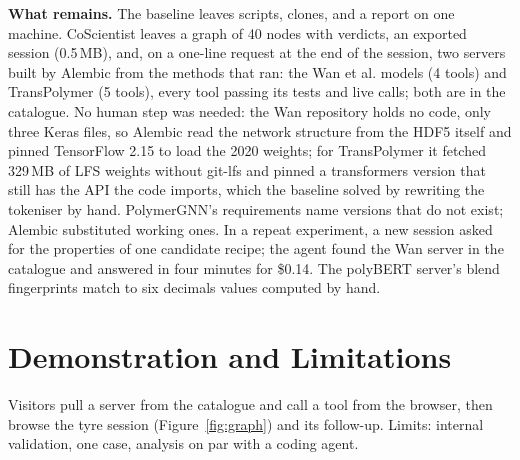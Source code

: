 \documentclass[letterpaper]{article} %
\begin{document}
\textbf{What remains.} The baseline leaves scripts, clones, and a report on
one machine. CoScientist leaves a graph of 40 nodes with verdicts, an exported
session (0.5\,MB), and, on a one-line request at the end of the session, two
servers built by Alembic from the methods that ran: the Wan et al. models (4
tools) and TransPolymer (5 tools), every tool passing its tests and live calls;
both are in the catalogue. No human step was needed: the Wan repository holds no
code, only three Keras files, so Alembic read the network structure from the
HDF5 itself and pinned TensorFlow 2.15 to load the 2020 weights; for
TransPolymer it fetched 329\,MB of LFS weights without git-lfs and pinned a
transformers version that still has the API the code imports, which the
baseline solved by rewriting the tokeniser by hand. PolymerGNN's requirements
name versions that do not exist; Alembic substituted working ones.
In a repeat experiment, a new session asked for the properties of one
candidate recipe; the agent found the Wan server in the catalogue and answered
in four minutes for \$0.14. The polyBERT server's
blend fingerprints match to six decimals values computed by hand.

\section{Demonstration and Limitations}

Visitors pull a server from the catalogue and call a tool from the browser,
then browse the tyre session (Figure~\ref{fig:graph}) and its follow-up.
Limits: internal validation, one case, analysis on par with a coding agent.


\end{document}
